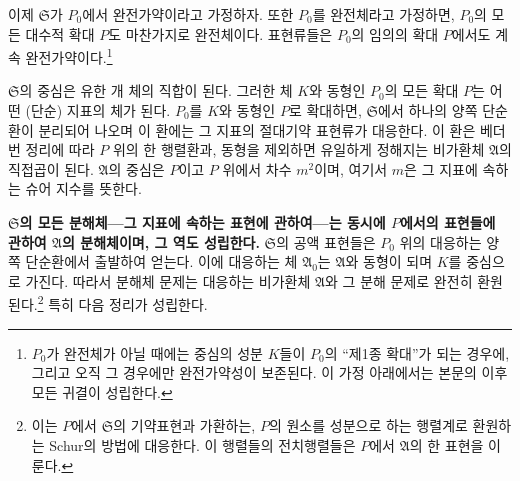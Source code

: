 \documentclass[11pt]{article}
\providecommand{\mS}{\mathfrak{S}}
\providecommand{\mA}{\mathfrak{A}}
\providecommand{\srcspaced}[1]{\textbf{#1}}
\begin{document}
이제 $\mS$가 $P_0$에서 완전가약이라고 가정하자. 또한 $P_0$를 완전체라고 가정하면, $P_0$의 모든 대수적 확대 $P$도 마찬가지로 완전체이다. 표현류들은 $P_0$의 임의의 확대 $P$에서도 계속 완전가약이다.\footnote{$P_0$가 완전체가 아닐 때에는 중심의 성분 $K$들이 $P_0$의 ``제1종 확대''가 되는 경우에, 그리고 오직 그 경우에만 완전가약성이 보존된다. 이 가정 아래에서는 본문의 이후 모든 귀결이 성립한다.}

$\mS$의 중심은 유한 개 체의 직합이 된다. 그러한 체 $K$와 동형인 $P_0$의 모든 확대 $P$는 어떤 (단순) 지표의 체가 된다. $P_0$를 $K$와 동형인 $P$로 확대하면, $\mS$에서 하나의 양쪽 단순환이 분리되어 나오며 이 환에는 그 지표의 절대기약 표현류가 대응한다. 이 환은 베더번 정리에 따라 $P$ 위의 한 행렬환과, 동형을 제외하면 유일하게 정해지는 비가환체 $\mA$의 직접곱이 된다. $\mA$의 중심은 $P$이고 $P$ 위에서 차수 $m^2$이며, 여기서 $m$은 그 지표에 속하는 슈어 지수를 뜻한다.

\srcspaced{$\mS$의 모든 분해체---그 지표에 속하는 표현에 관하여---는 동시에 $P$에서의 표현들에 관하여 $\mA$의 분해체이며, 그 역도 성립한다.} $\mS$의 공액 표현들은 $P_0$ 위의 대응하는 양쪽 단순환에서 출발하여 얻는다. 이에 대응하는 체 $\mA_0$는 $\mA$와 동형이 되며 $K$를 중심으로 가진다. 따라서 분해체 문제는 대응하는 비가환체 $\mA$와 그 분해 문제로 완전히 환원된다.\footnote{이는 $P$에서 $\mS$의 기약표현과 가환하는, $P$의 원소를 성분으로 하는 행렬계로 환원하는 Schur의 방법에 대응한다. 이 행렬들의 전치행렬들은 $P$에서 $\mA$의 한 표현을 이룬다.} 특히 다음 정리가 성립한다.
\end{document}
